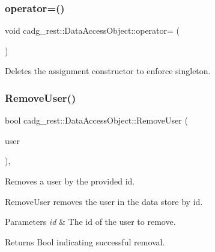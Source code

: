 \mbox{\label{classcadg__rest_1_1_data_access_object_ac17c7c54dd84c1d512c83cb6a15bb894}} 
\subsubsection{\texorpdfstring{operator=()}{operator=()}}
{\footnotesize\ttfamily void cadg\+\_\+rest\+::\+Data\+Access\+Object\+::operator= (\begin{DoxyParamCaption}\item[{\mbox{\hyperlink{classcadg__rest_1_1_data_access_object}{Data\+Access\+Object}} const \&}]{ }\end{DoxyParamCaption})\hspace{0.3cm}{\ttfamily [delete]}}



Deletes the assignment constructor to enforce singleton. 

\mbox{\label{classcadg__rest_1_1_data_access_object_a049df84fde79be3547fe363be40850e4}} 
\subsubsection{\texorpdfstring{RemoveUser()}{RemoveUser()}}
{\footnotesize\ttfamily bool cadg\+\_\+rest\+::\+Data\+Access\+Object\+::\+Remove\+User (\begin{DoxyParamCaption}\item[{\mbox{\hyperlink{structcadg__rest_1_1_user}{User}}}]{user }\end{DoxyParamCaption})\hspace{0.3cm}{\ttfamily [override]}, {\ttfamily [virtual]}}



Removes a user by the provided id. 

Remove\+User removes the user in the data store by id.


\begin{DoxyParams}{Parameters}
{\em id} & The id of the user to remove. \\
\hline
\end{DoxyParams}
\begin{DoxyReturn}{Returns}
Bool indicating successful removal. 
\end{DoxyReturn}



